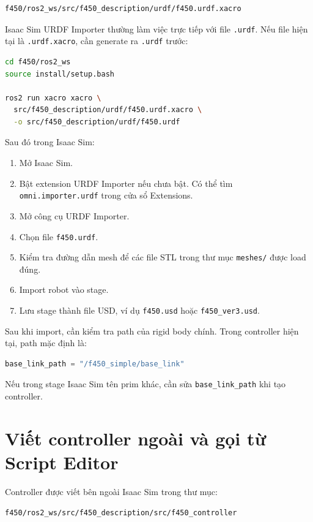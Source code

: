 \begin{lstlisting}[language=bash]
f450/ros2_ws/src/f450_description/urdf/f450.urdf.xacro
\end{lstlisting}

Isaac Sim URDF Importer thường làm việc trực tiếp với file \texttt{.urdf}. Nếu
file hiện tại là \texttt{.urdf.xacro}, cần generate ra \texttt{.urdf} trước:

\begin{lstlisting}[language=bash]
cd f450/ros2_ws
source install/setup.bash

ros2 run xacro xacro \
  src/f450_description/urdf/f450.urdf.xacro \
  -o src/f450_description/urdf/f450.urdf
\end{lstlisting}

Sau đó trong Isaac Sim:

\begin{enumerate}
    \item Mở Isaac Sim.
    \item Bật extension URDF Importer nếu chưa bật. Có thể tìm
    \texttt{omni.importer.urdf} trong cửa sổ Extensions.
    \item Mở công cụ URDF Importer.
    \item Chọn file \texttt{f450.urdf}.
    \item Kiểm tra đường dẫn mesh để các file STL trong thư mục
    \texttt{meshes/} được load đúng.
    \item Import robot vào stage.
    \item Lưu stage thành file USD, ví dụ \texttt{f450.usd} hoặc
    \texttt{f450\_ver3.usd}.
\end{enumerate}

Sau khi import, cần kiểm tra path của rigid body chính. Trong controller hiện
tại, path mặc định là:

\begin{lstlisting}[language=Python]
base_link_path = "/f450_simple/base_link"
\end{lstlisting}

Nếu trong stage Isaac Sim tên prim khác, cần sửa \texttt{base\_link\_path} khi
tạo controller.

\section{Viết controller ngoài và gọi từ Script Editor}

Controller được viết bên ngoài Isaac Sim trong thư mục:

\begin{lstlisting}[language=bash]
f450/ros2_ws/src/f450_description/src/f450_controller
\end{lstlisting}

